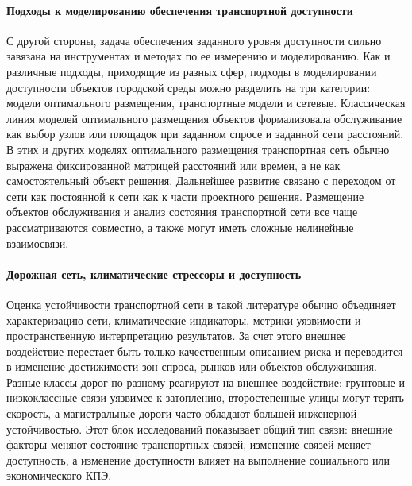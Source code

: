 \paragraph*{Подходы к моделированию обеспечения транспортной доступности}
С другой стороны, задача обеспечения заданного уровня доступности сильно завязана на инструментах и методах по ее измерению и моделированию. Как и различные подходы, приходящие из разных сфер, подходы в моделировании доступности объектов городской среды можно разделить на три категории: модели оптимального размещения, транспортные модели и сетевые. Классическая линия моделей оптимального размещения объектов формализовала обслуживание как выбор узлов или площадок при заданном спросе и заданной сети расстояний. В этих и других моделях оптимального размещения транспортная сеть обычно выражена фиксированной матрицей расстояний или времен, а не как самостоятельный объект решения. Дальнейшее развитие связано с переходом от сети как постоянной к сети как к части проектного решения. Размещение объектов обслуживания и анализ состояния транспортной сети все чаще рассматриваются совместно, а также могут иметь сложные нелинейные взаимосвязи.

\paragraph*{Дорожная сеть, климатические стрессоры и доступность}
Оценка устойчивости транспортной сети в такой литературе обычно объединяет характеризацию сети, климатические индикаторы, метрики уязвимости и пространственную интерпретацию результатов. За счет этого внешнее воздействие перестает быть только качественным описанием риска и переводится в изменение достижимости зон спроса, рынков или объектов обслуживания. Разные классы дорог по-разному реагируют на внешнее воздействие: грунтовые и низкоклассные связи уязвимее к затоплению, второстепенные улицы могут терять скорость, а магистральные дороги часто обладают большей инженерной устойчивостью. Этот блок исследований показывает общий тип связи: внешние факторы меняют состояние транспортных связей, изменение связей меняет доступность, а изменение доступности влияет на выполнение социального или экономического КПЭ.

